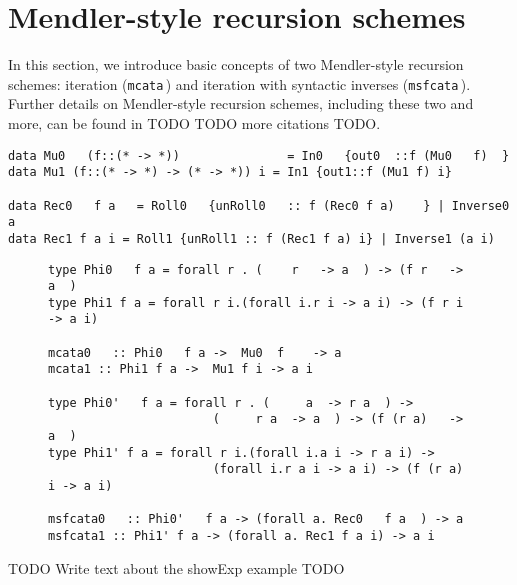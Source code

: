 \section{Mendler-style recursion schemes}
\label{sec:mendler}
In this section, we introduce basic concepts of two Mendler-style recursion
schemes: iteration (\lstinline{mcata}\,) and iteration with syntactic inverses
(\lstinline{msfcata}\,). Further details on Mendler-style recursion schemes,
including these two and more, can be found in \cite{AhnShe11} TODO TODO
more citations TODO.

\begin{lstlisting}[caption={TODO \label{lst:mu}}]
data Mu0   (f::(* -> *))               = In0   {out0  ::f (Mu0   f)  }
data Mu1 (f::(* -> *) -> (* -> *)) i = In1 {out1::f (Mu1 f) i}
                                                              
data Rec0   f a   = Roll0   {unRoll0   :: f (Rec0 f a)    } | Inverse0   a
data Rec1 f a i = Roll1 {unRoll1 :: f (Rec1 f a) i} | Inverse1 (a i)
\end{lstlisting}

\begin{figure}
\begin{lstlisting}[caption={TODO \label{lst:reccomb}}]
type Phi0   f a = forall r . (    r   -> a  ) -> (f r   -> a  )
type Phi1 f a = forall r i.(forall i.r i -> a i) -> (f r i -> a i)

mcata0   :: Phi0   f a ->  Mu0  f    -> a
mcata1 :: Phi1 f a ->  Mu1 f i -> a i

type Phi0'   f a = forall r . (     a  -> r a  ) ->
                       (     r a  -> a  ) -> (f (r a)   -> a  )
type Phi1' f a = forall r i.(forall i.a i -> r a i) ->
                       (forall i.r a i -> a i) -> (f (r a) i -> a i)

msfcata0   :: Phi0'   f a -> (forall a. Rec0   f a  ) -> a
msfcata1 :: Phi1' f a -> (forall a. Rec1 f a i) -> a i
\end{lstlisting}
\vspace*{-3ex}
\end{figure}

TODO Write text about the showExp example TODO

